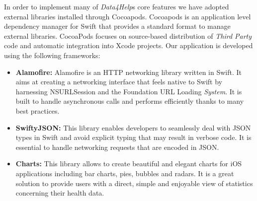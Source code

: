 \documentclass[titlepage]{article}
\begin{document}
	In order to implement many of {\it Data4Help}\textsc{}s core features we have adopted external libraries installed through Cocoapods. Cocoapods is an application level dependency manager for Swift that provides a standard format to manage external libraries. CocoaPods focuses on source-based distribution of {\it Third Party} code and automatic integration into Xcode projects.
	Our application is developed using the following frameworks:
	\begin{itemize}
		\item {\bf Alamofire:}
		Alamofire is an HTTP networking library written in Swift. It aims at creating a networking interface that feels native to Swift by harnessing NSURLSession and the Foundation URL Loading {\it System}. It is built to handle asynchronous calls and performs efficiently thanks to many best practices.
		\item {\bf SwiftyJSON:}
		This library enables developers to seamlessly deal with JSON types in Swift and avoid explicit typing that may result in verbose code. It is essential to handle networking requests that are encoded in JSON.
		\item {\bf Charts:}
		This library allows to create beautiful and elegant charts for iOS applications including bar charts, pies, bubbles and radars. It is a great solution to provide users with a direct, simple and enjoyable view of statistics concerning their health data.
	\end{itemize}
	
\end{document}
